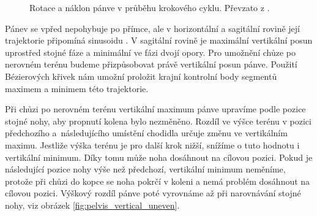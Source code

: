 \begin{figure}[h]
\begin{center}
\qquad
{}
\caption{Rotace a náklon pánve v průběhu krokového cyklu. Převzato z \cite{biomechanika_chuze}.} \label{pelvic kinematics}
\end{center}
\end{figure}

Pánev se vpřed nepohybuje po přímce, ale v ho\-ri\-zontální a sagitální rovině její trajektorie připomíná sinusoidu \cite{lin2014quantitative}. V sagitální rovině je maximální vertikální posun uprostřed stojné fáze a minimální ve fázi dvojí opory. Pro umožnění chůze po nerovném terénu budeme přizpůsobovat právě vertikální posun pánve. Použití Bézierových křivek nám umožní proložit krajní kontrolní body segmentů ma\-xi\-mem a minimem této trajektorie.

Při chůzi po nerovném terénu vertikální maximum pánve upravíme podle pozice stojné nohy, aby propnu\-tí kolena bylo nezměněno. Rozdíl ve výšce terénu v pozici předchozího a~následujícího umístění chodidla určuje změnu ve vertikálním maximu. Jestliže výška terénu je pro další krok nižší, snížíme o tuto hodnotu i vertikální minimum. Díky tomu může noha dosáhnout na cílovou pozici. Pokud je následující pozice nohy výše než předchozí, vertikální minimum neměníme, protože při chůzi do kopce se noha pokrčí v koleni a nemá problém dosáhnout na cílovou pozici. Výškový rozdíl pánve poté vyrovnáme až při narovnávání stojné nohy, viz obrázek \ref{fig:pelvis_vertical_uneven}.

